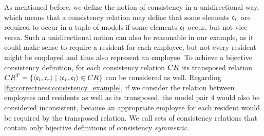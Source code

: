 

As mentioned before, we define the notion of consistency in a unidirectional way, which means that a consistency relation may define that some elements $\conditionelement{c}{r}$ are required to occur in a tuple of models if some elements $\conditionelement{c}{l}$ occur, but not vice versa.
Such a unidirectional notion can also be reasonable in our example, as it could make sense to require a resident for each employee, but not every resident might be employed and thus also represent an employee.
To achieve a bijective consistency definition, for each consistency relation $\consistencyrelation{CR}{}$ its transposed relation $\consistencyrelation{CR}{}^T = \setted{\tupled{\conditionelement{c}{l}, \conditionelement{c}{r}} \mid \tupled{\conditionelement{c}{r}, \conditionelement{c}{l}} \in \consistencyrelation{CR}{}}$ can be considered as well.
Regarding \autoref{fig:correctness:consistency_example}, if we consider the relation between employees and residents as well as its transposed, the model pair $4$ would also be considered inconsistent, because an appropriate employee for each resident would be required by the transposed relation.
We call sets of consistency relations that contain only bijective definitions of consistency \emph{symmetric}.

